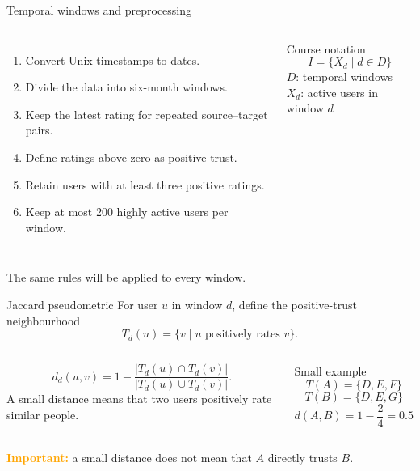 \documentclass[aspectratio=169,11pt]{beamer}
\newcommand{\caution}[1]{\textcolor{Orange}{\textbf{#1}}}
\begin{document}
\begin{frame}{Temporal windows and preprocessing}
  \begin{columns}[T,onlytextwidth]
      \begin{enumerate}
        \item Convert Unix timestamps to dates.
        \item Divide the data into six-month windows.
        \item Keep the latest rating for repeated source--target pairs.
        \item Define ratings above zero as positive trust.
        \item Retain users with at least three positive ratings.
        \item Keep at most 200 highly active users per window.
      \end{enumerate}

      \begin{block}{Course notation}
        \[
          I=\{X_d\mid d\in D\}
        \]
        $D$: temporal windows\\[0.15cm]
        $X_d$: active users in window $d$
      \end{block}
  \end{columns}

  \vspace{0.25cm}
  The same rules will be applied to every window.
\end{frame}

\begin{frame}{Jaccard pseudometric}
  For user $u$ in window $d$, define the positive-trust neighbourhood
  \[
    T_d(u)=\{v\mid u\text{ positively rates }v\}.
  \]

  \begin{columns}[T,onlytextwidth]
      \[
        d_d(u,v)=1-\frac{|T_d(u)\cap T_d(v)|}{|T_d(u)\cup T_d(v)|}.
      \]
      A small distance means that two users positively rate similar people.

      \begin{block}{Small example}
        \[
          T(A)=\{D,E,F\}
        \]
        \[
          T(B)=\{D,E,G\}
        \]
        \[
          d(A,B)=1-\frac{2}{4}=0.5
        \]
      \end{block}
  \end{columns}

  \caution{Important:} a small distance does not mean that $A$ directly trusts $B$.
\end{frame}
\end{document}
